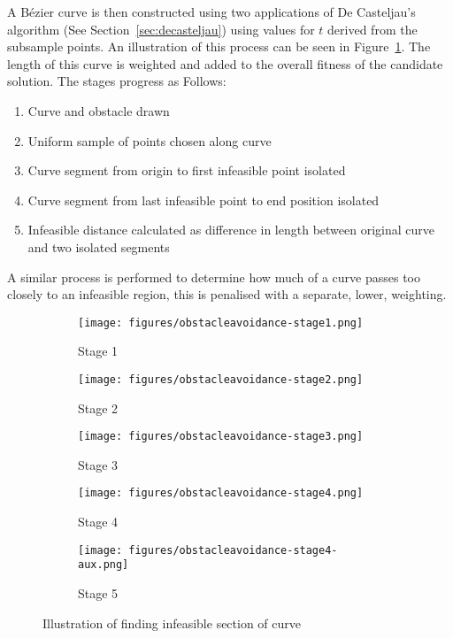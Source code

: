 A Bézier curve is then constructed using two applications of De Casteljau's algorithm (See Section~\ref{sec:decasteljau}) using values for $t$ derived from the subsample points. An illustration of this process can be seen in Figure~\ref{fig:ifspace-illustration}. The length of this curve is weighted and added to the overall fitness of the candidate solution. The stages progress as Follows:

\begin{enumerate}
  \item Curve and obstacle drawn
  \item Uniform sample of points chosen along curve
  \item Curve segment from origin to first infeasible point isolated
  \item Curve segment from last infeasible point to end position isolated
  \item Infeasible distance calculated as difference in length between original curve and two isolated segments
\end{enumerate}


A similar process is performed to determine how much of a curve passes too closely to an infeasible region, this is penalised with a separate, lower, weighting.

\begin{figure}
  \centering
  \begin{subfigure}[b]{0.44\textwidth}
    \centering
    \texttt{[image: figures/obstacleavoidance-stage1.png]}
    \caption{Stage 1}
  \end{subfigure}
  \begin{subfigure}[b]{0.44\textwidth}
    \centering
    \texttt{[image: figures/obstacleavoidance-stage2.png]}
    \caption{Stage 2}
  \end{subfigure}
  \begin{subfigure}[b]{0.44\textwidth}
    \centering
    \texttt{[image: figures/obstacleavoidance-stage3.png]}
    \caption{Stage 3}
  \end{subfigure}
  \begin{subfigure}[b]{0.44\textwidth}
    \centering
    \texttt{[image: figures/obstacleavoidance-stage4.png]}
    \caption{Stage 4}
  \end{subfigure}
  \begin{subfigure}[b]{0.44\textwidth}
    \centering
    \texttt{[image: figures/obstacleavoidance-stage4-aux.png]}
    \caption{Stage 5}
  \end{subfigure}
  \caption{\label{fig:ifspace-illustration} Illustration of finding infeasible section of curve}
\end{figure}



